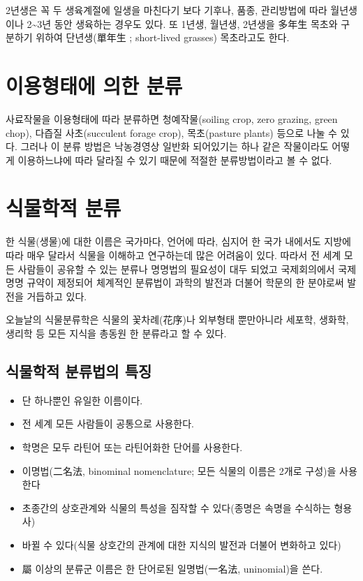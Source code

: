 \documentclass[]{book}
\providecommand{\tightlist}{%
  \setlength{\itemsep}{0pt}\setlength{\parskip}{0pt}}
\begin{document}
2년생은 꼭 두 생육계절에 일생을 마친다기 보다 기후나, 품종, 관리방법에
따라 월년생이나 2\textasciitilde{}3년 동안 생육하는 경우도 있다. 또
1년생, 월년생, 2년생을 多年生 목초와 구분하기 위하여 단년생(單年生 ;
short-lived grasses) 목초라고도 한다.

\section{이용형태에 의한 분류}\label{--}

사료작물을 이용형태에 따라 분류하면 청예작물(soiling crop, zero grazing,
green chop), 다즙질 사초(succulent forage crop), 목초(pasture plants)
등으로 나눌 수 있다. 그러나 이 분류 방법은 낙농경영상 일반화 되어있기는
하나 같은 작물이라도 어떻게 이용하느냐에 따라 달라질 수 있기 때문에
적절한 분류방법이라고 볼 수 없다.

\section{식물학적 분류}\label{-}

한 식물(생물)에 대한 이름은 국가마다, 언어에 따라, 심지어 한 국가
내에서도 지방에 따라 매우 달라서 식물을 이해하고 연구하는데 많은
어려움이 있다. 따라서 전 세계 모든 사람들이 공유할 수 있는 분류나
명명법의 필요성이 대두 되었고 국제회의에서 국제 명명 규약이 제정되어
체계적인 분류법이 과학의 발전과 더불어 학문의 한 분야로써 발전을
거듭하고 있다.

오늘날의 식물분류학은 식물의 꽃차례(花序)나 외부형태 뿐만아니라 세포학,
생화학, 생리학 등 모든 지식을 총동원 한 분류라고 할 수 있다.

\subsection{식물학적 분류법의 특징}\label{--}

\begin{itemize}
\tightlist
\item
  단 하나뿐인 유일한 이름이다.
\item
  전 세계 모든 사람들이 공통으로 사용한다.
\item
  학명은 모두 라틴어 또는 라틴어화한 단어를 사용한다.
\item
  이명법(二名法, binominal nomenclature; 모든 식물의 이름은 2개로
  구성)을 사용한다
\item
  초종간의 상호관계와 식물의 특성을 짐작할 수 있다(종명은 속명을
  수식하는 형용사)
\item
  바뀔 수 있다(식물 상호간의 관계에 대한 지식의 발전과 더불어 변화하고
  있다)
\item
  屬 이상의 분류군 이름은 한 단어로된 일명법(一名法, uninomial)을 쓴다.
\end{itemize}
\end{document}
